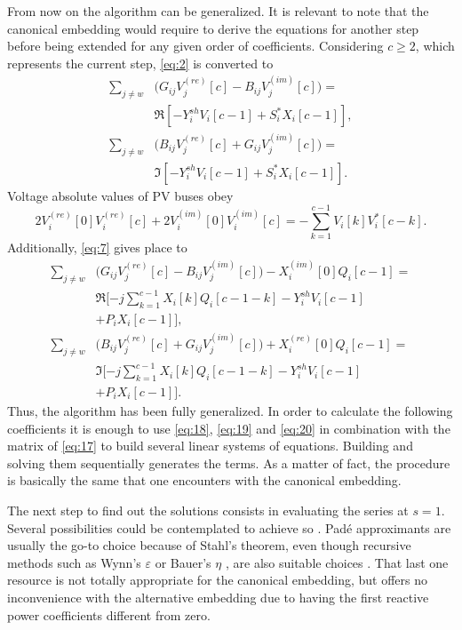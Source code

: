 \documentclass[journal]{IEEEtran}
\begin{document}
From now on the algorithm can be generalized. It is relevant to note that the canonical embedding would require to derive the equations for another step before being extended for any given order of coefficients. Considering $c\geq 2$, which represents the current step, \eqref{eq:2} is converted to
\begin{equation}
  \begin{split}
    \sum_{j\neq w}&\biggl(G_{ij}V^{(re)}_j[c]-B_{ij}V^{(im)}_j[c]\biggr)=\\
    &\Re[ - Y^{sh}_iV_i[c-1]+S^*_iX_i[c-1]],\\
    \sum_{j\neq w}&\biggl(B_{ij}V^{(re)}_j[c]+G_{ij}V^{(im)}_j[c]\biggr)=\\
    &\Im[ - Y^{sh}_iV_i[c-1]+S^*_iX_i[c-1]].
  \end{split}
  \label{eq:18}
\end{equation}
Voltage absolute values of PV buses obey
\begin{equation}
 2V^{(re)}_i[0]V^{(re)}_i[c]+2V^{(im)}_i[0]V^{(im)}_i[c]=-\sum_{k=1}^{c-1}V_i[k]V^*_i[c-k].
  \label{eq:19}
\end{equation}
Additionally, \eqref{eq:7} gives place to
\begin{equation}
  \begin{split}
    \sum_{j\neq w}&\biggl(G_{ij}V^{(re)}_j[c]-B_{ij}V^{(im)}_j[c]\biggr)-X^{(im)}_i[0]Q_i[c-1]=\\
    &\Re[ -j\sum_{k=1}^{c-1}X_i[k]Q_i[c-1-k]- Y^{sh}_iV_i[c-1]\\
    &+P_iX_i[c-1]],\\
    \sum_{j\neq w}&\biggl(B_{ij}V^{(re)}_j[c]+G_{ij}V^{(im)}_j[c]\biggr)+X^{(re)}_i[0]Q_i[c-1]=\\
    &\Im[-j\sum_{k=1}^{c-1}X_i[k]Q_i[c-1-k] - Y^{sh}_iV_i[c-1]\\
    &+P_iX_i[c-1]].
  \end{split}
  \label{eq:20}
\end{equation}
Thus, the algorithm has been fully generalized. In order to calculate the following coefficients it is enough to use \eqref{eq:18}, \eqref{eq:19} and \eqref{eq:20} in combination with the matrix of \eqref{eq:17} to build several linear systems of equations. Building and solving them sequentially generates the terms. As a matter of fact, the procedure is basically the same that one encounters with the canonical embedding. 

The next step to find out the solutions consists in evaluating the series at $s=1$. Several possibilities could be contemplated to achieve so \cite{Trias2018}. Padé approximants are usually the go-to choice because of Stahl's theorem, even though recursive methods such as Wynn's $\varepsilon$ or Bauer's $\eta$ \cite{weniger},\cite{graves} are also suitable choices \cite{Rao}. That last one resource is not totally appropriate for the canonical embedding, but offers no inconvenience with the alternative embedding due to having the first reactive power coefficients different from zero.
\end{document}

